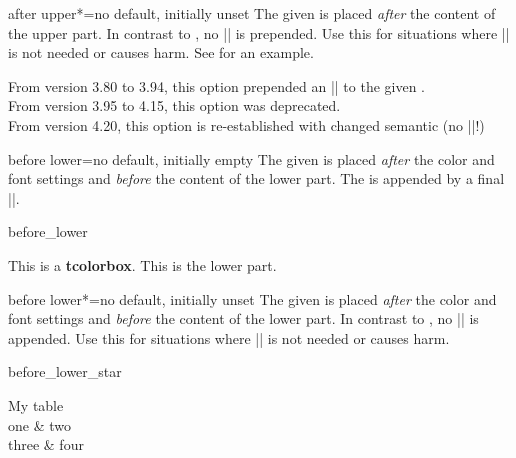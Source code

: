 \begin{docTcbKey}[][doc new and updated={2016-10-21}{2019-02-28}]{after upper*}{=}{no default, initially unset}
  The given  is placed \emph{after} the content of the upper part.
  In contrast to , no |\unskip| is prepended.
  Use this for situations where |\unskip| is not needed or causes harm.
  See  for an example.

\begin{marker}
  From version 3.80 to 3.94, this option prepended an |\unskip| to the given .\\
  From version 3.95 to 4.15, this option was deprecated.\\
  From version 4.20, this option is re-established with changed semantic (no |\unskip|!)
\end{marker}
\end{docTcbKey}


\clearpage
\begin{docTcbKey}{before lower}{=}{no default, initially empty}
  The given  is placed \emph{after} the color and font settings
  and \emph{before} the content of the lower part.
  The  is appended by a final |\ignorespaces|.
\begin{exdispExample}{before_lower}

\begin{tcolorbox}
This is a \textbf{tcolorbox}.
\tcblower
This is the lower part.
\end{tcolorbox}
\end{exdispExample}
\end{docTcbKey}


\begin{docTcbKey}[][doc new=2019-02-26]{before lower*}{=}{no default, initially unset}
  The given  is placed \emph{after} the color and font settings
  and \emph{before} the content of the lower part.
  In contrast to , no |\ignorespaces| is appended.
  Use this for situations where |\ignorespaces| is not needed or causes harm.
\begin{exdispExample}{before_lower_star}
\begin{tcolorbox}[size=small,bicolor,sidebyside,center lower,
  colback=yellow!30,colbacklower=yellow!20,colframe=yellow!80!black,
  before lower*=\begin{tabular}{cc},
  after lower*=\end{tabular},
]
My table
\tcblower
  \\
  one & two \\
  three & four\\
\end{tcolorbox}
\end{exdispExample}
\end{docTcbKey}


